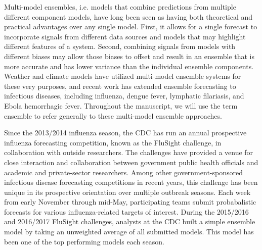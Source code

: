 \documentclass{article}\usepackage[]{graphicx}\usepackage[]{color}
\begin{document}
Multi-model ensembles, i.e. models that combine predictions from multiple different component models, have long been seen as having both theoretical and practical advantages over any single model.\cite{bates1969combination,Wolpert1992,Polikar2006,Hastie2009}
First, it allows for a single forecast to incorporate signals from different data sources and models that may highlight different features of a system. 
Second, combining signals from models with different biases may allow those biases to offset and result in an ensemble that is more accurate and has lower variance than the individual ensemble components. Weather and climate models have utilized multi-model ensemble systems for these very purposes\cite{krishnamurti1999improved,Palmer2002,Raftery2005,Leutbecher2008}, and recent work has extended ensemble forecasting to infectious diseases, including influenza, dengue fever, lymphatic filariasis, and Ebola hemorrhagic fever.\cite{Yamana2017,Smith2017,Viboud2017,Ray2018} 
Throughout the manuscript, we will use the term ensemble to refer generally to these multi-model ensemble approaches.

Since the 2013/2014 influenza season, the CDC has run an annual prospective influenza forecasting competition, known as the FluSight challenge, in collaboration with outside researchers. 
The challenges have provided a venue for close interaction and collaboration between government public health officials and academic and private-sector researchers. 
Among other government-sponsored infectious disease forecasting competitions in recent years,\cite{DARPA2015,NOAA} this challenge has been unique in its prospective orientation over multiple outbreak seasons.
Each week from early November through mid-May, participating teams submit probabalistic forecasts for various influenza-related targets of interest.
During the 2015/2016 and 2016/2017 FluSight challenges, analysts at the CDC built a simple ensemble model by taking an unweighted average of all submitted models. 
This model has been one of the top performing models each season.\cite{McGowan2018}
\end{document}
